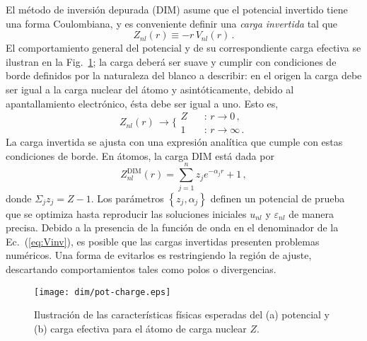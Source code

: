 El método de inversión depurada (DIM) asume que el potencial invertido 
tiene una forma Coulombiana, y es conveniente definir una \textit{carga 
invertida} tal que
\begin{equation}
Z_{nl}(r) \equiv -r \, V_{nl}(r) \,.
\label{eq:Zinv}
\end{equation}
El comportamiento general del potencial y de su correspondiente carga 
efectiva se ilustran en la Fig.~\ref{fig:potycharge}; la carga deberá 
ser suave y cumplir con condiciones de borde definidos por la naturaleza 
del blanco a describir: 
en el origen la carga debe ser igual a la carga nuclear del átomo y 
asintóticamente, debido al apantallamiento electrónico, ésta debe ser
igual a uno. Esto es,
\begin{equation}
Z_{nl}(r) \, \rightarrow 
\bigg\{ 
\begin{array}{ll}
Z  \ \  & \ \ \text{:\ \ }r  \rightarrow 0 \,, \\ 
1           & \ \ \text{:\ \ }r  \rightarrow \infty \,.
\end{array}
\label{eq:Zasympt}
\end{equation} 
La carga invertida se ajusta con una expresión analítica que cumple con 
estas condiciones de borde. En átomos, la carga DIM está dada por
\begin{equation}
Z_{nl}^{\mathrm{DIM}}(r)= \sum_{j=1}^{n} z_j e^{-\alpha_j r}+1 \,,
\label{eq:atomzDIM}
\end{equation}
donde $\Sigma_j z_j=Z-1$. Los parámetros $\left\{z_j,\alpha_j\right\}$ 
definen un potencial de prueba que se optimiza hasta reproducir las 
soluciones iniciales $u_{nl}$ y $\varepsilon_{nl}$ de manera precisa. 
Debido a la presencia de la función de onda en el denominador de la 
Ec.~(\ref{eq:Vinv}), es posible que las cargas invertidas presenten 
problemas numéricos. Una forma de evitarlos es restringiendo la región 
de ajuste, descartando comportamientos tales como polos o divergencias. 

\begin{figure}[t]
\centering
\texttt{[image: dim/pot-charge.eps]}
\caption[Características físicas del potencial y carga efectiva.]
{Ilustración de las características físicas esperadas del (a) potencial 
y (b) carga efectiva para el átomo de carga nuclear $Z$.}
\label{fig:potycharge}
\end{figure}

